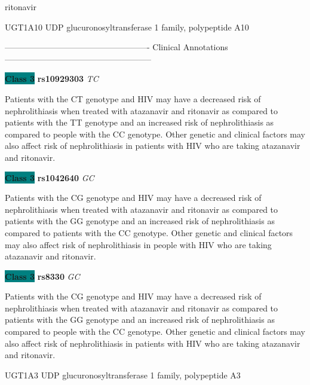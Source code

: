 \documentclass{resume} %
\begin{document}
\begin{rSection}{ ritonavir }
\begin{rSubsection}{ UGT1A10 }{ UDP glucuronosyltransferase 1 family, polypeptide A10 }{}{}
\item[] ---------------------------------------------------- Clinical Annotations -----------------------------------------------------\newline
\item \textbf{\colorbox{teal} {Class 3}} \textbf{ rs10929303 } \textit{ TC }
\item[] Patients with the CT genotype and HIV may have a decreased risk of nephrolithiasis when treated with atazanavir and ritonavir as compared to patients with the TT genotype and an increased risk of nephrolithiasis as compared to people with the CC genotype. Other genetic and clinical factors may also affect risk of nephrolithiasis in patients with HIV who are taking atazanavir and ritonavir. \item \textbf{\colorbox{teal} {Class 3}} \textbf{ rs1042640 } \textit{ GC }
\item[] Patients with the CG genotype and HIV may have a decreased risk of nephrolithiasis when treated with atazanavir and ritonavir as compared to patients with the GG genotype and an increased risk of nephrolithiasis as compared to patients with the CC genotype. Other genetic and clinical factors may also affect risk of nephrolithiasis in people with HIV who are taking atazanavir and ritonavir.\item \textbf{\colorbox{teal} {Class 3}} \textbf{ rs8330 } \textit{ GC }
\item[] Patients with the CG genotype and HIV may have a decreased risk of nephrolithiasis when treated with atazanavir and ritonavir as compared to patients with the GG genotype and an increased risk of nephrolithiasis as compared to people with the CC genotype. Other genetic and clinical factors may also affect risk of nephrolithiasis in patients with HIV who are taking atazanavir and ritonavir.
\end{rSubsection}\begin{rSubsection}{ UGT1A3 }{ UDP glucuronosyltransferase 1 family, polypeptide A3 }{}{}
\item[]


\end{rSubsection}
\end{rSection}
\end{document}
